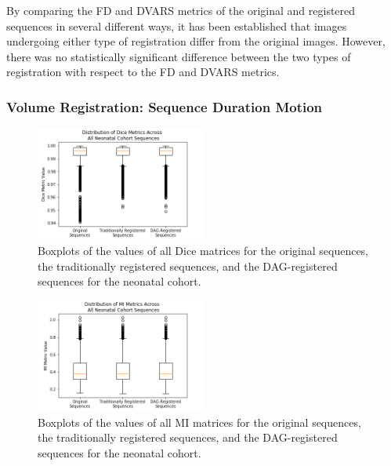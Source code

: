 By comparing the FD and DVARS metrics of the original and registered sequences in several different ways, it has been established that images undergoing either type of registration differ from the original images. However, there was no statistically significant difference between the two types of registration with respect to the FD and DVARS metrics.

\subsubsection{Volume Registration: Sequence Duration Motion}

\begin{figure}[t!]
\centering
\includegraphics[width=0.5\textwidth]{6/figures/neonates-dice-box.png}
\caption{Boxplots of the values of all Dice matrices for the original sequences, the traditionally registered sequences, and the DAG-registered sequences for the neonatal cohort.}
\label{fig:neonates-dice-box}
\end{figure}

\begin{figure}[t!]
\centering
\includegraphics[width=0.5\textwidth]{6/figures/neonates-mi-box.png}
\caption{Boxplots of the values of all MI matrices for the original sequences, the traditionally registered sequences, and the DAG-registered sequences for the neonatal cohort.}
\label{fig:neonates-mi-box}
\end{figure}

